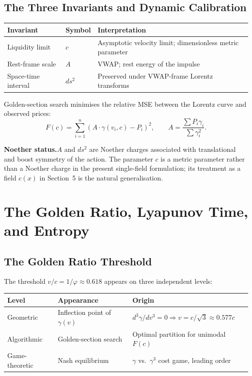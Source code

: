 \documentclass[12pt,a4paper]{article}
\begin{document}
\subsection{The Three Invariants and Dynamic Calibration}

\begin{center}
\begin{tabular}{lll}
\toprule
Invariant & Symbol & Interpretation \\
\midrule
Liquidity limit & $c$ & Asymptotic velocity limit; dimensionless metric parameter \\
Rest-frame scale & $A$ & VWAP; rest energy of the impulse \\
Space-time interval & $ds^2$ & Preserved under VWAP-frame Lorentz transforms \\
\bottomrule
\end{tabular}
\end{center}

Golden-section search minimises the relative MSE between the Lorentz
curve and observed prices:
\begin{equation}
    F(c) = \sum_{i=1}^{n}\!\left(A\cdot\gamma(v_i, c) - P_i\right)^2,
    \qquad A = \frac{\sum P_i \gamma_i}{\sum \gamma_i^2}.
\end{equation}

\textbf{Noether status.}\quad $A$ and $ds^2$ are Noether charges
associated with translational and boost symmetry of the action.
The parameter $c$ is a metric parameter rather than a Noether charge
in the present single-field formulation; its treatment as a field
$c(x)$ in Section~5 is the natural generalisation.


\section{The Golden Ratio, Lyapunov Time, and Entropy}

\subsection{The Golden Ratio Threshold}

The threshold $v/c = 1/\varphi \approx 0.618$ appears on three
independent levels:

\begin{center}
\begin{tabular}{lll}
\toprule
Level & Appearance & Origin \\
\midrule
Geometric & Inflection point of $\gamma(v)$ & $d^3\gamma/dv^3 = 0 \Rightarrow v=c/\sqrt{3}\approx 0.577c$ \\
Algorithmic & Golden-section search & Optimal partition for unimodal $F(c)$ \\
Game-theoretic & Nash equilibrium & $\gamma$ vs.\ $\gamma^3$ cost game, leading order \\
\bottomrule
\end{tabular}
\end{center}
\end{document}
